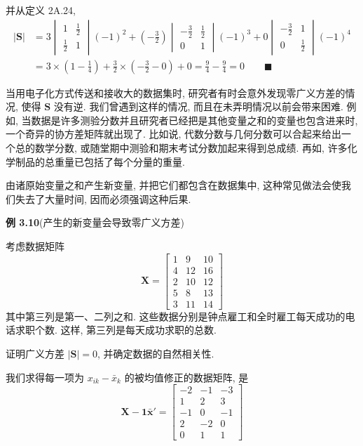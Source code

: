 并从定义 2A.24,
\begin{align*}
|\mathbf{S}|&=3\begin{vmatrix}1&\frac{1}{2}\\\frac{1}{2}&1\end{vmatrix}(-1)^{2}+\left(-\frac{3}{2}\right)\begin{vmatrix}-\frac{3}{2}&\frac{1}{2}\\0&1\end{vmatrix}(-1)^{3}+0\begin{vmatrix}-\frac{3}{2}&1\\0&\frac{1}{2}\end{vmatrix}(-1)^{4}\\
&=3\times\left(1-\frac{1}{4}\right)+\frac{3}{2}\times\left(-\frac{3}{2}-0\right)+0=\frac{9}{4}-\frac{9}{4}=0\qquad\blacksquare
\end{align*}

当用电子化方式传送和接收大的数据集时, 研究者有时会意外发现零广义方差的情况, 使得 $\mathbf{S}$ 没有逆. 我们曾遇到这样的情况, 而且在未弄明情况以前会带来困难. 例如, 当数据是许多测验分数并且研究者已经把是其他变量之和的变量也包含进来时, 一个奇异的协方差矩阵就出现了. 比如说, 代数分数与几何分数可以合起来给出一个总的数学分数, 或随堂期中测验和期末考试分数加起来得到总成绩. 再如, 许多化学制品的总重量已包括了每个分量的重量.

由诸原始变量之和产生新变量, 并把它们都包含在数据集中, 这种常见做法会使我们失去了大量时间, 因而必须强调这种后果.

\noindent\textbf{例 3.10}\quad (产生的新变量会导致零广义方差)

考虑数据矩阵
\[
\mathbf{X}=\begin{bmatrix}1&9&10\\4&12&16\\2&10&12\\5&8&13\\3&11&14\end{bmatrix}
\]
其中第三列是第一、二列之和. 这些数据分别是钟点雇工和全时雇工每天成功的电话求职个数. 这样, 第三列是每天成功求职的总数.

证明广义方差 $|\mathbf{S}|=0$, 并确定数据的自然相关性.

我们求得每一项为 $x_{ik}-\bar{x}_{k}$ 的被均值修正的数据矩阵, 是
\[
\mathbf{X}-\mathbf{1}\bar{\mathbf{x}}'=\begin{bmatrix}-2&-1&-3\\1&2&3\\-1&0&-1\\2&-2&0\\0&1&1\end{bmatrix}
\]
